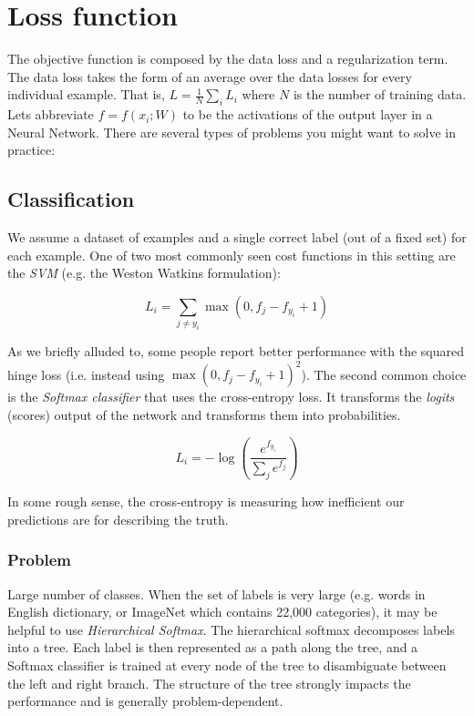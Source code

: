 \chapter{Loss function}

The objective function is composed by the data loss and a regularization term. The data loss takes the form of an average over the data losses for every individual example. That is, $L = \frac{1}{N} \sum_i L_i$ where $N$ is the number of training data. Lets abbreviate $f = f(x_i; W)$ to be the activations of the output layer in a Neural Network. There are several types of problems you might want to solve in practice:

\section*{Classification}

We assume a dataset of examples and a single correct label (out of a fixed set) for each example. One of two most commonly seen cost functions in this setting are the \textit{SVM} (e.g. the Weston Watkins formulation):

\begin{equation}
L_i = \sum_{j\neq y_i} \max(0, f_j - f_{y_i} + 1)
\end{equation}

As we briefly alluded to, some people report better performance with the squared hinge loss (i.e. instead using $\max(0, f_j - f_{y_i} + 1)^2$). The second common choice is the \textit{Softmax classifier} that uses the cross-entropy loss. It transforms the \textit{logits} (scores) output of the network and transforms them into probabilities.

\begin{equation}
L_i = -\log\left(\frac{e^{f_{y_i}}}{ \sum_j e^{f_j} }\right)
\end{equation}

In some rough sense, the cross-entropy is measuring how inefficient our predictions are for describing the truth.

\subsection*{Problem}

Large number of classes. When the set of labels is very large (e.g. words in English dictionary, or ImageNet which contains 22,000 categories), it may be helpful to use \textit{Hierarchical Softmax}. The hierarchical softmax decomposes labels into a tree. Each label is then represented as a path along the tree, and a Softmax classifier is trained at every node of the tree to disambiguate between the left and right branch. The structure of the tree strongly impacts the performance and is generally problem-dependent.

